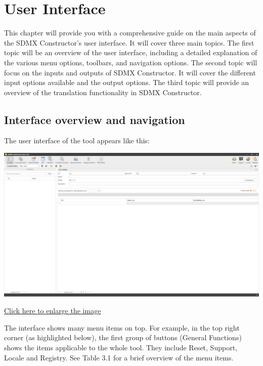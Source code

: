 \documentclass[
]{book}
\theoremstyle{definition}
\theoremstyle{definition}
\theoremstyle{definition}
\theoremstyle{definition}
\theoremstyle{remark}
\begin{document}
\hypertarget{user-interface}{%
\chapter{User Interface}\label{user-interface}}

This chapter will provide you with a comprehensive guide on the main aspects of the SDMX Constructor's user interface. It will cover three main topics. The first topic will be an overview of the user interface, including a detailed explanation of the various menu options, toolbars, and navigation options. The second topic will focus on the inputs and outputs of SDMX Constructor. It will cover the different input options available and the output options. The third topic will provide an overview of the translation functionality in SDMX Constructor.

\hypertarget{interface-overview-and-navigation}{%
\section{Interface overview and navigation}\label{interface-overview-and-navigation}}

The user interface of the tool appears like this:

\begin{center}\includegraphics[width=1\linewidth]{./images/image009} \end{center}

\href{images/image009.png}{Click here to enlarge the image}

The interface shows many menu items on top. For example, in the top right corner (as highlighted below), the first group of buttons (General Functions) shows the items applicable to the whole tool. They include Reset, Support, Locale and Registry. See Table 3.1 for a brief overview of the menu items.
\end{document}
